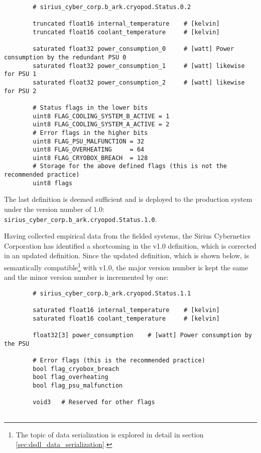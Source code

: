 \begin{remark}[breakable]
    \begin{verbatim}
        # sirius_cyber_corp.b_ark.cryopod.Status.0.2

        truncated float16 internal_temperature    # [kelvin]
        truncated float16 coolant_temperature     # [kelvin]

        saturated float32 power_consumption_0     # [watt] Power consumption by the redundant PSU 0
        saturated float32 power_consumption_1     # [watt] likewise for PSU 1
        saturated float32 power_consumption_2     # [watt] likewise for PSU 2

        # Status flags in the lower bits
        uint8 FLAG_COOLING_SYSTEM_B_ACTIVE = 1
        uint8 FLAG_COOLING_SYSTEM_A_ACTIVE = 2
        # Error flags in the higher bits
        uint8 FLAG_PSU_MALFUNCTION = 32
        uint8 FLAG_OVERHEATING     = 64
        uint8 FLAG_CRYOBOX_BREACH  = 128
        # Storage for the above defined flags (this is not the recommended practice)
        uint8 flags
    \end{verbatim}

    The last definition is deemed sufficient and is deployed to the production system
    under the version number of 1.0: \verb|sirius_cyber_corp.b_ark.cryopod.Status.1.0|.

    Having collected empirical data from the fielded systems, the Sirius Cybernetics Corporation has
    identified a shortcoming in the v1.0 definition, which is corrected in an updated definition.
    Since the updated definition, which is shown below, is semantically compatible\footnote{%
        The topic of data serialization is explored in detail in section \ref{sec:dsdl_data_serialization}.
    } with v1.0, the major version number is kept the same and the minor version number is incremented by one:

    \begin{verbatim}
        # sirius_cyber_corp.b_ark.cryopod.Status.1.1

        saturated float16 internal_temperature    # [kelvin]
        saturated float16 coolant_temperature     # [kelvin]

        float32[3] power_consumption    # [watt] Power consumption by the PSU

        # Error flags (this is the recommended practice)
        bool flag_cryobox_breach
        bool flag_overheating
        bool flag_psu_malfunction

        void3   # Reserved for other flags


\end{verbatim}
\end{remark}
